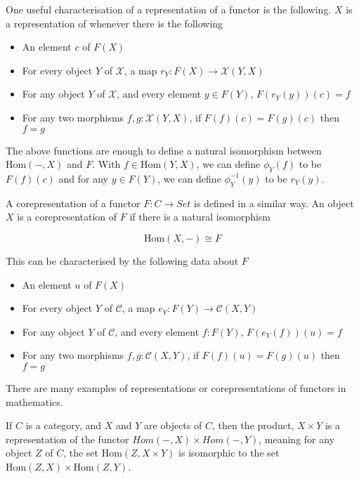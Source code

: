 \documentclass[12pt]{article} %
\theoremstyle{definition}
\theoremstyle{definition}
\theoremstyle{definition}
\theoremstyle{definition}
\begin{document}
One useful characterisation of a representation of a functor is the following. $X$ is a representation of
whenever there is the following

\begin{itemize}
  \item An element $c$ of $F(X)$
  \item For every object $Y$ of $\mathcal{X}$, a map $r_Y : F(X) \to \mathcal{X}(Y, X)$
  \item For any object $Y$ of $\mathcal{X}$, and every element $y \in F(Y)$, $F(r_Y(y))(c) = f$
  \item For any two morphisms $f, g : \mathcal{X}(Y, X)$, if $F(f)(c) = F(g)(c)$ then $f = g$
\end{itemize}

The above functions are enough to define a natural isomorphism between $\text{Hom}(-, X)$ and $F$.
With $f \in \text{Hom}(Y,X)$, we can define $\phi_Y(f)$ to be $F(f)(c)$ and
 for any $y \in F(Y)$, we can define $\phi_Y^{-1}(y)$ to be $r_Y(y)$.

A corepresentation of a functor $F : C \rightarrow Set$ is defined in a similar way.
An object $X$ is a corepresentation of $F$ if there is a natural isomorphism

\begin{equation}
  \text{Hom}(X, -) \cong F
\end{equation}

This can be characterised by the following data about $F$

\begin{itemize}
  \item An element $u$ of $F(X)$
  \item For every object $Y$ of $\mathcal{C}$, a map $e_Y : F(Y) \to \mathcal{C}(X, Y)$
  \item For any object $Y$ of $\mathcal{C}$, and every element $f : F(Y)$, $F(e_Y(f))(u) = f$
  \item For any two morphisms $f, g : \mathcal{C}(X, Y)$, if $F(f)(u) = F(g)(u)$ then $f = g$
\end{itemize}


There are many examples of representations or corepresentations of functors in mathematics.

If $C$ is a category, and $X$ and $Y$ are objects of $C$, then the product, $X \times Y$ is a representation
of the functor $Hom(-, X) \times Hom(-, Y)$, meaning for any object $Z$ of $C$, the set
$\text{Hom}(Z, X \times Y)$ is isomorphic to the set $\text{Hom}(Z, X) \times \text{Hom}(Z, Y)$.
\end{document}
